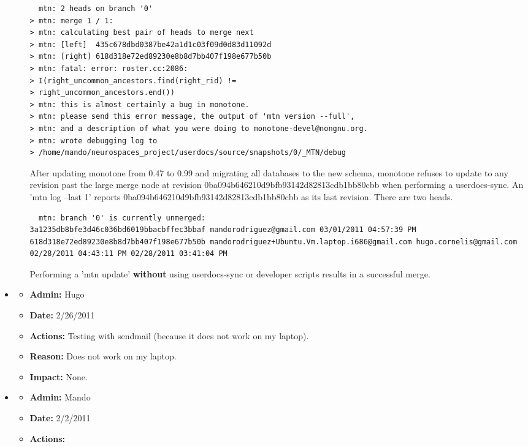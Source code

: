 \documentclass[12pt]{article}
\begin{document}
\begin{itemize}
\begin{itemize}
  \begin{verbatim}
  mtn: 2 heads on branch '0'
> mtn: merge 1 / 1:
> mtn: calculating best pair of heads to merge next
> mtn: [left]  435c678dbd0387be42a1d1c03f09d0d83d11092d
> mtn: [right] 618d318e72ed89230e8b8d7bb407f198e677b50b
> mtn: fatal: error: roster.cc:2086:
> I(right_uncommon_ancestors.find(right_rid) !=
> right_uncommon_ancestors.end())
> mtn: this is almost certainly a bug in monotone.
> mtn: please send this error message, the output of 'mtn version --full',
> mtn: and a description of what you were doing to monotone-devel@nongnu.org.
> mtn: wrote debugging log to
> /home/mando/neurospaces_project/userdocs/source/snapshots/0/_MTN/debug
  \end{verbatim}
  
   After updating monotone from 0.47 to 0.99 and migrating all databases to the new schema, monotone refuses to update to any revision past 
   the large merge node at revision 0ba094b646210d9bfb93142d82813cdb1bb80cbb when performing a userdocs-sync. An 'mtn log --last 1' reports 0ba094b646210d9bfb93142d82813cdb1bb80cbb as its last revision. There are two heads.
   
  \begin{verbatim}
  mtn: branch '0' is currently unmerged:
3a1235db8bfe3d46c036bd6019bbacbffec3bbaf mandorodriguez@gmail.com 03/01/2011 04:57:39 PM
618d318e72ed89230e8b8d7bb407f198e677b50b mandorodriguez+Ubuntu.Vm.laptop.i686@gmail.com hugo.cornelis@gmail.com 02/28/2011 04:43:11 PM 02/28/2011 03:41:04 PM
  \end{verbatim}
  
  Performing a 'mtn update' {\bf without} using userdocs-sync or developer scripts results in a successful merge. 
  
  
  \end{itemize}


\item
  \begin{itemize}
  \item[] {\bf Admin:} Hugo
  \item[] {\bf Date:} 2/26/2011 
  \item[] {\bf Actions:} Testing with sendmail (because it does not work on my laptop).
  \item[] {\bf Reason:} Does not work on my laptop.
  \item[] {\bf Impact:} None.
  \end{itemize}

\item
\begin{itemize}
\item[] {\bf Admin:} Mando
\item[] {\bf Date:} 2/2/2011 
\item[] {\bf Actions:}  


\end{itemize}
\end{itemize}
\end{document}

